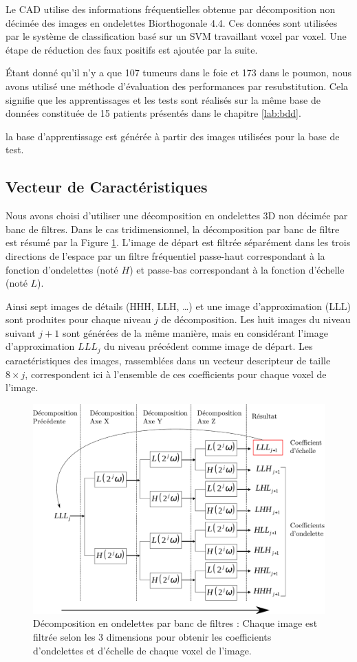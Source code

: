 Le CAD utilise des informations fréquentielles obtenue par décomposition non décimée des images en ondelettes Biorthogonale 4.4. Ces données sont utilisées par le système de classification basé sur un SVM travaillant voxel par voxel. Une étape de réduction des faux positifs est ajoutée par la suite.

Étant donné qu'il n'y a que 107 tumeurs dans le foie et 173 dans le poumon, nous avons utilisé une méthode d'évaluation des performances par resubstitution. Cela signifie que les apprentissages et les tests sont réalisés sur la même base de données constituée de 15 patients présentés dans le chapitre \ref{lab:bdd}.


la base d'apprentissage est générée à partir des images utilisées pour la base de test. 

\subsection{Vecteur de Caractéristiques}

Nous avons choisi d’utiliser une décomposition en ondelettes 3D non décimée par banc de filtres. Dans le cas tridimensionnel, la décomposition par banc de filtre est résumé par la Figure \ref{fig:ondelettes}. L’image de départ est filtrée séparément dans les trois directions de l’espace par un filtre fréquentiel passe-haut correspondant à la fonction d’ondelettes (noté $H$) et passe-bas correspondant à la fonction d’échelle (noté $L$). 

Ainsi sept images de détails (HHH, LLH, \dots) et une image d’approximation (LLL) sont produites pour chaque niveau $j$ de décomposition. Les huit images du niveau suivant $j+1$ sont générées de la même manière, mais en considérant l’image d’approximation $LLL_j$ du niveau précédent comme image de départ. Les caractéristiques des images, rassemblées dans un vecteur descripteur de taille $8\times j$, correspondent ici à l’ensemble de ces coefficients pour chaque voxel  de l’image. 

\begin{figure}
 \includegraphics[width=15cm]{images/decompHotell}
 \caption{Décomposition en ondelettes par banc de filtres : Chaque image est filtrée selon les 3 dimensions pour obtenir les coefficients d'ondelettes et d'échelle de chaque voxel de l'image.}
 \label{fig:ondelettes}
\end{figure}


